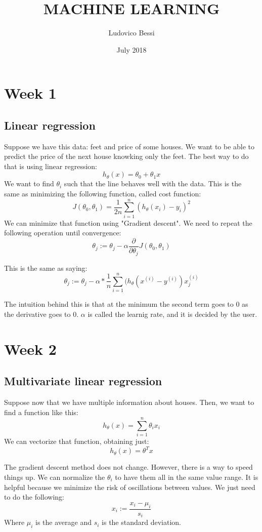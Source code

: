 \documentclass{article}
\title{\LARGE MACHINE LEARNING}
\author{Ludovico Bessi}
\date{July 2018}
\begin{document}
\maketitle
\tableofcontents
\section{Week 1}
\subsection{Linear regression}
Suppose we have this data: feet and price of some houses. We want to be able to
predict the price of the next house knowking only the feet. The best way to do
that is using linear regression: $$ h_\theta(x) = \theta_0 + \theta_1 x $$
We want to find $\theta_i$ such that the line behaves well with the data.
This is the same as minimizing the following function, called cost function:
$$ J(\theta_0,\theta_1) = \frac{1}{2n}\sum_{i=1}^{n}(h_\theta(x_i) - y_i)^2$$
We can minimize that function using "Gradient descent".
We need to repeat the following operation until convergence:
$$ \theta_j := \theta_j -\alpha \frac{\partial}{\partial \theta_j}
J(\theta_0,\theta_1)$$

This is the same as saying:
$$ \theta_j := \theta_j - \alpha*\frac{1}{n}\sum_{i=1}^{n}(h_\theta(x^{(i)} - y^{(i)})x_j^{(i)}$$

The intuition behind this is that at the minimum the second term goes to 0 as
the derivative goes to 0. $\alpha$ is called the learnig rate, and it is decided
by the user.
\newpage


\section{Week 2}
\subsection{Multivariate linear regression}
Suppose now that we have multiple information about houses.
Then, we want to find a function like this:
$$ h_\theta(x) = \sum_{i=1}^{n} \theta_i x_i $$
We can vectorize that function, obtaining just:
$$ h_\theta(x) = \theta^T x $$

The gradient descent method does not change. However, there is a way to speed
things up. We can normalize the $\theta_i$ to have them all in the same value
range. It is helpful because we minimize the risk of oscillations between values.
We just need to do the following:
$$ x_i := \frac{x_i - \mu_i}{s_i} $$
Where $\mu_i$ is the average and $s_i$ is the standard deviation.
\end{document}
